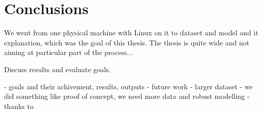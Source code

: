 \chapter{Conclusions}

We went from one physical machine with Linux on it to dataset and model and it explanation, which was the goal of this thesis. The thesis is quite wide and not aiming at particular part of the process...

Discuss results and evaluate goals.

- goals and their achivement, results, outputs
- future work
    - larger dataset
    - we did something like proof of concept, we need more data and robust modelling
- thanks to